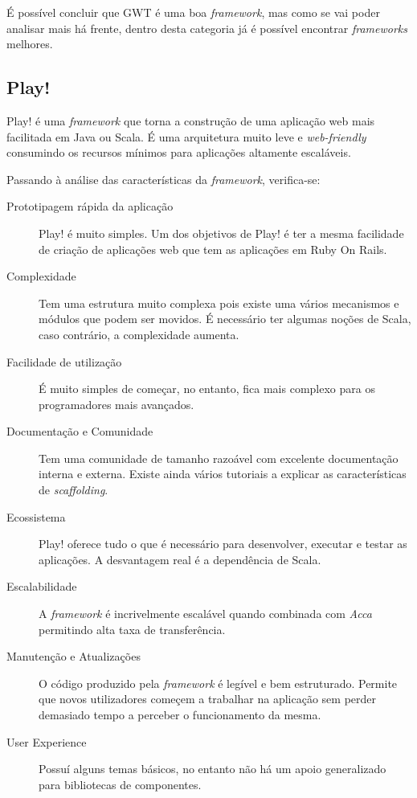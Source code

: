 É possível concluir que GWT é uma boa \textit{framework}, mas como se vai poder analisar mais há frente, dentro desta categoria já é possível encontrar \textit{frameworks} melhores.

\subsection{Play!}

Play! é uma \textit{framework} que torna a construção de uma aplicação web mais facilitada em Java ou Scala. É uma arquitetura muito leve e \textit{web-friendly} consumindo os recursos mínimos para aplicações altamente escaláveis.

Passando à análise das características da \textit{framework}, verifica-se:

\begin{description}
\item[Prototipagem rápida da aplicação] Play! é muito simples. Um dos objetivos de Play! é ter a mesma facilidade de criação de aplicações web que tem as aplicações em Ruby On Rails.

\item[Complexidade] Tem uma estrutura muito complexa pois existe uma vários mecanismos e módulos que podem ser movidos. É necessário ter algumas noções de Scala, caso contrário, a complexidade aumenta.

\item[Facilidade de utilização] É muito simples de começar, no entanto, fica mais complexo para os programadores mais avançados.

\item[Documentação e Comunidade] Tem uma comunidade de tamanho razoável com excelente documentação interna e externa. Existe ainda vários tutoriais a explicar as características de \textit{scaffolding}.

\item[Ecossistema] Play! oferece tudo o que é necessário para desenvolver, executar e testar as aplicações. A desvantagem real é a dependência de Scala.

\item[Escalabilidade] A \textit{framework} é incrivelmente escalável quando combinada com \textit{Acca} permitindo alta taxa de transferência.

\item[Manutenção e Atualizações] O código produzido pela \textit{framework} é legível e bem estruturado. Permite que novos utilizadores começem a trabalhar na aplicação sem perder demasiado tempo a perceber o funcionamento da mesma.

\item[User Experience] Possuí alguns temas básicos, no entanto não há um apoio generalizado para bibliotecas de componentes.
\end{description}

